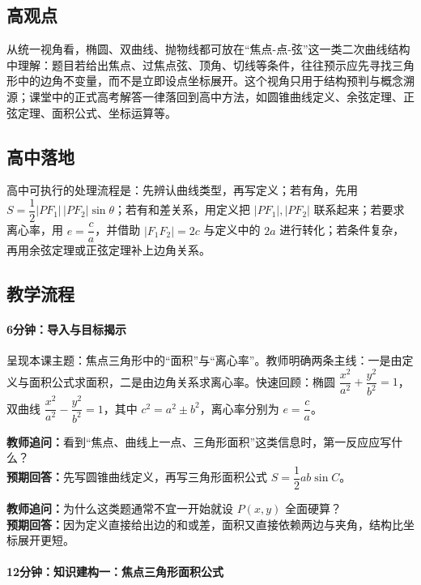 \documentclass[UTF8,a4paper,11pt]{ctexart}
\begin{document}
\subsection*{高观点}

从统一视角看，椭圆、双曲线、抛物线都可放在“焦点-点-弦”这一类二次曲线结构中理解：题目若给出焦点、过焦点弦、顶角、切线等条件，往往预示应先寻找三角形中的边角不变量，而不是立即设点坐标展开。这个视角只用于结构预判与概念溯源；课堂中的正式高考解答一律落回到高中方法，如圆锥曲线定义、余弦定理、正弦定理、面积公式、坐标运算等。

\subsection*{高中落地}

高中可执行的处理流程是：先辨认曲线类型，再写定义；若有角，先用 $S=\dfrac12|PF_1|\,|PF_2|\sin\theta$；若有和差关系，用定义把 $|PF_1|,|PF_2|$ 联系起来；若要求离心率，用 $e=\dfrac ca$，并借助 $|F_1F_2|=2c$ 与定义中的 $2a$ 进行转化；若条件复杂，再用余弦定理或正弦定理补上边角关系。

\subsection*{教学流程}

\paragraph{6分钟：导入与目标揭示}

呈现本课主题：焦点三角形中的“面积”与“离心率”。教师明确两条主线：一是由定义与面积公式求面积，二是由边角关系求离心率。快速回顾：椭圆 $\dfrac{x^2}{a^2}+\dfrac{y^2}{b^2}=1$，双曲线 $\dfrac{x^2}{a^2}-\dfrac{y^2}{b^2}=1$，其中 $c^2=a^2\pm b^2$，离心率分别为 $e=\dfrac ca$。

\noindent\textbf{教师追问：}看到“焦点、曲线上一点、三角形面积”这类信息时，第一反应应写什么？\\

\textbf{预期回答：}先写圆锥曲线定义，再写三角形面积公式 $S=\dfrac12ab\sin C$。\par

\noindent\textbf{教师追问：}为什么这类题通常不宜一开始就设 $P(x,y)$ 全面硬算？\\

\textbf{预期回答：}因为定义直接给出边的和或差，面积又直接依赖两边与夹角，结构比坐标展开更短。\par

\paragraph{12分钟：知识建构一：焦点三角形面积公式}
\end{document}
